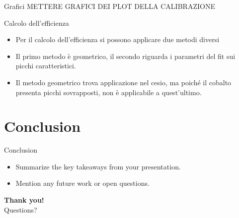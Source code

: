 \documentclass [xcolor=svgnames] {beamer}
\begin{document}
\begin{frame}{Grafici}
	METTERE GRAFICI DEI PLOT DELLA CALIBRAZIONE
\end{frame}

\begin{frame}{Calcolo dell'efficienza}
	\begin{itemize}
		\item Per il calcolo dell'efficienza si possono applicare due metodi diversi
		\item Il primo metodo è geometrico, il secondo riguarda i parametri del fit sui picchi caratteristici.
		\item Il metodo geometrico trova applicazione nel cesio, ma poiché il cobalto presenta picchi sovrapposti, non è applicabile a quest'ultimo.
	\end{itemize}
\end{frame}
	
	\section{Conclusion}
	\begin{frame}{Conclusion}
		\begin{itemize}
			\item Summarize the key takeaways from your presentation.
			\item Mention any future work or open questions.
		\end{itemize}
	\end{frame}
	
	\begin{frame}
		\centering
		\textbf{Thank you!}\\
		Questions?
	\end{frame}
	
\end{document}
